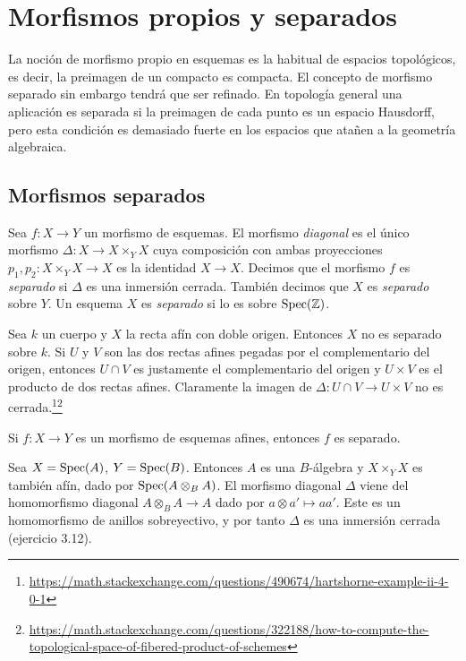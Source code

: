 \documentclass[GA.tex]{subfiles}
\begin{document}

\chapter{Morfismos propios y separados}

La noción de morfismo propio en esquemas es la habitual de espacios topológicos, es decir, la preimagen de un compacto es compacta. El concepto de morfismo separado sin embargo tendrá que ser refinado. En topología general una aplicación es separada si la preimagen de cada punto es un espacio Hausdorff, pero esta condición es demasiado fuerte en los espacios que atañen a la geometría algebraica. 

\section{Morfismos separados}


\begin{defi}
Sea $f:X\to Y$ un morfismo de esquemas. El morfismo \emph{diagonal} es el único morfismo $\Delta:X\to X\times_Y X$ cuya composición con ambas proyecciones $p_1,p_2:X\times_Y X\to X$ es la identidad $X\to X$. Decimos que el morfismo $f$ es \emph{separado} si $\Delta$ es una inmersión cerrada. También decimos que $X$ es \emph{separado} sobre $Y$. Un esquema $X$ es \emph{separado} si lo es sobre $\operatorname{Spec}(\mathbb{Z})$.  
\end{defi}

\begin{ej}
Sea $k$ un cuerpo y $X$ la recta afín con doble origen. Entonces $X$ no es separado sobre $k$. Si $U$ y $V$ son las dos rectas afines pegadas por el complementario del origen, entonces $U\cap V$ es justamente el complementario del origen y $U\times V$ es el producto de dos rectas afines. Claramente la imagen de $\Delta:U\cap V\to U\times V$ no es cerrada.\footnote{\url{https://math.stackexchange.com/questions/490674/hartshorne-example-ii-4-0-1}}\footnote{\url{https://math.stackexchange.com/questions/322188/how-to-compute-the-topological-space-of-fibered-product-of-schemes}}
\end{ej}

\begin{prop}
Si $f:X\to Y$ es un morfismo de esquemas afines, entonces $f$ es separado.
\end{prop}
\begin{dem}
Sea $X=\operatorname{Spec}(A)$, $Y=\operatorname{Spec}(B)$. Entonces $A$ es una $B$-álgebra y $X\times_Y X$ es también afín, dado por $\operatorname{Spec}(A\otimes_B A)$. El morfismo diagonal $\Delta$ viene del homomorfismo diagonal $A\otimes_B A\to A$ dado por $a\otimes a'\mapsto aa'$. Este es un homomorfismo de anillos sobreyectivo, y por tanto $\Delta$ es una inmersión cerrada (ejercicio 3.12).
\end{dem}
\end{document}
